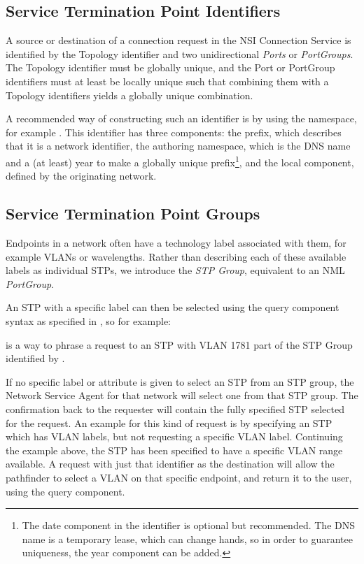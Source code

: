 \documentclass[12pt]{article}  %
\begin{document}
\subsection{Service Termination Point Identifiers}

A source or destination of a connection request in the NSI Connection Service is identified by 
the Topology identifier and two unidirectional \emph{Ports} or \emph{PortGroups}. The Topology identifier must be globally unique, and the Port or PortGroup identifiers must at least be locally unique such that combining them with a Topology identifiers yields a globally unique combination.

A recommended way of constructing such an identifier is by using 
the  namespace, for example .
This identifier has three components: the prefix,  
which describes that it is a network identifier, the authoring namespace,  
which is the DNS name and a (at least) year to make a globally unique prefix\footnote{  
The date component in the identifier is optional but recommended. The DNS name 
is a temporary lease, which can change hands, so in order to guarantee uniqueness, 
the year component can be added.}, and the local component,  defined by the originating 
network.


\subsection{Service Termination Point Groups}

Endpoints in a network often have a technology label associated 
with them, for example VLANs or wavelengths. Rather than describing each of these 
available labels as individual STPs, we introduce the \emph{STP Group}, equivalent to 
an NML \emph{PortGroup}.

An STP with a specific label can then be selected using the query 
component syntax as specified in \cite{RFC3986}, so for example:

 is a way to phrase 
a request to an STP with VLAN 1781 part of the STP Group identified by 
.


If no specific label or attribute is given to select an STP from 
an STP group, the Network Service Agent for that network will select one from that STP group. The 
confirmation back to the requester will contain the fully specified STP selected 
for the request. An example for this kind of request is by specifying an STP which 
has VLAN labels, but not requesting a specific VLAN label. Continuing the example 
above, the STP  has been specified to have a 
specific VLAN range available. A request with just that identifier as the destination 
will allow the pathfinder to select a VLAN on that specific endpoint, and return 
it to the user, using the query component.
\end{document}
